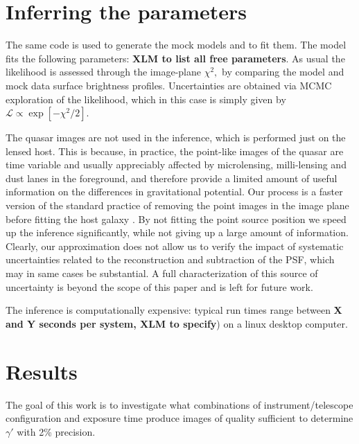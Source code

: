 \documentclass[a4paper,11pt]{article}
\begin{document}
\section{Inferring the parameters}

The same code is used to generate the mock models and to fit them. The
model fits the following parameters: {\bf XLM to list all free
parameters}. As usual the likelihood is assessed through the
image-plane $\chi^{2},$ by comparing the model and mock data surface
brightness profiles.  Uncertainties are obtained via MCMC exploration
of the likelihood, which in this case is simply given by
$\mathcal{L}\propto\exp[-\chi^{2}/2].$

The quasar images are not used in the inference, which is performed
just on the lensed host. This is because, in practice, the point-like
images of the quasar are time variable and usually appreciably
affected by microlensing, milli-lensing and dust lanes in the
foreground, and therefore provide a limited amount of useful
information on the differences in gravitational potential. Our process
is a faster version of the standard practice of removing the point
images in the image plane before fitting the host galaxy
\cite{Suyu++13}. By not fitting the point source position we speed up
the inference significantly, while not giving up a large amount of
information. Clearly, our approximation does not allow us to verify
the impact of systematic uncertainties related to the reconstruction
and subtraction of the PSF, which may in same cases be substantial. A
full characterization of this source of uncertainty is beyond the
scope of this paper and is left for future work.

The inference is computationally expensive: typical run times range
between \textbf{X and Y seconds per system, XLM to specify}) on a
linux desktop computer.

\section{Results}

The goal of this work is to investigate what combinations of
instrument/telescope configuration and exposure time produce images of
quality sufficient to determine $\gamma'$ with 2\% precision. 
\end{document}
